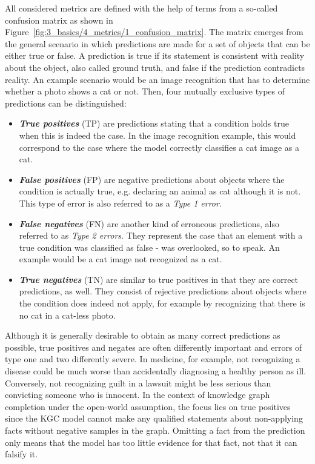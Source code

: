 All considered metrics are defined with the help of terms from a so-called confusion matrix as shown in Figure~\ref{fig:3_basics/4_metrics/1_confusion_matrix}. The matrix emerges from the general scenario in which predictions are made for a set of objects that can be either true or false. A prediction is true if its statement is consistent with reality about the object, also called ground truth, and false if the prediction contradicts reality. An example scenario would be an image recognition that has to determine whether a photo shows a cat or not. Then, four mutually exclusive types of predictions can be distinguished:

\begin{itemize}
    \item \textbf{\emph{True positives}} (TP) are predictions stating that a condition holds true when this is indeed the case. In the image recognition example, this would correspond to the case where the model correctly classifies a cat image as a cat.

    \item \textbf{\emph{False positives}} (FP) are negative predictions about objects where the condition is actually true, e.g. declaring an animal as cat although it is not. This type of error is also referred to as a \emph{Type 1 error}.

    \item \textbf{\emph{False negatives}} (FN) are another kind of erroneous predictions, also referred to as \emph{Type 2 errors}. They represent the case that an element with a true condition was classified as false - was overlooked, so to speak. An example would be a cat image not recognized as a cat.

    \item \textbf{\emph{True negatives}} (TN) are similar to true positives in that they are correct predictions, as well. They consist of rejective predictions about objects where the condition does indeed not apply, for example by recognizing that there is no cat in a cat-less photo.
\end{itemize}

Although it is generally desirable to obtain as many correct predictions as possible, true positives and negates are often differently important and errors of type one and two differently severe. In medicine, for example, not recognizing a disease could be much worse than accidentally diagnosing a healthy person as ill. Conversely, not recognizing guilt in a lawsuit might be less serious than convicting someone who is innocent. In the context of knowledge graph completion under the open-world assumption, the focus lies on true positives since the KGC model cannot make any qualified statements about non-applying facts without negative samples in the graph. Omitting a fact from the prediction only means that the model has too little evidence for that fact, not that it can falsify it.

